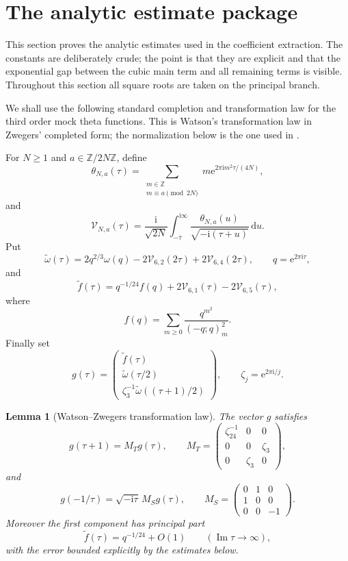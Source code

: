 \documentclass[10pt,a4paper]{amsart}
\newtheorem{lemma}[theorem]{Lemma}
\newcommand{\ii}{\mathrm i}
\newcommand{\e}{\mathrm e}
\newcommand{\dd}{\mathrm d}
\newcommand{\Z}{\mathbb Z}
\newcommand{\Impart}{\operatorname{Im}}
\begin{document}
\section{The analytic estimate package}\label{sec:estimate-package}

This section proves the analytic estimates used in the coefficient extraction.  The
constants are deliberately crude; the point is that they are explicit and that the
exponential gap between the cubic main term and all remaining terms is visible.
Throughout this section all square roots are taken on the principal branch.

We shall use the following standard completion and transformation law for the third
order mock theta functions.  This is Watson's transformation law in Zwegers'
completed form; the normalization below is the one used in \cite{ZwegersThesis,GarvanMukhopadhyay}.

For $N\geq1$ and $a\in\Z/2N\Z$, define
\[
\theta_{N,a}(\tau)=\sum_{\substack{m\in\Z\\ m\equiv a\pmod{2N}}}
 m\e^{2\pi\ii m^2\tau/(4N)},
\]
and
\[
\mathcal V_{N,a}(\tau)
=
\frac{\ii}{\sqrt{2N}}
\int_{-\overline\tau}^{\ii\infty}
\frac{\theta_{N,a}(u)}{\sqrt{-\ii(\tau+u)}}\,\dd u.
\]
Put
\[
\widetilde\omega(\tau)
=
2q^{2/3}\omega(q)-2\mathcal V_{6,2}(2\tau)+2\mathcal V_{6,4}(2\tau),
\qquad q=\e^{2\pi\ii\tau},
\]
and
\[
\widetilde f(\tau)
=
q^{-1/24}f(q)+2\mathcal V_{6,1}(\tau)-2\mathcal V_{6,5}(\tau),
\]
where
\[
f(q)=\sum_{m\geq0}\frac{q^{m^2}}{(-q;q)_m^2}.
\]
Finally set
\[
g(\tau)=
\begin{pmatrix}
\widetilde f(\tau)\\
\widetilde\omega(\tau/2)\\
\zeta_3^{-1}\widetilde\omega((\tau+1)/2)
\end{pmatrix},
\qquad
\zeta_j=\e^{2\pi\ii/j}.
\]

\begin{lemma}[Watson--Zwegers transformation law]\label{lem:wz-transform}
The vector $g$ satisfies
\begin{equation}\label{eq:gT}
g(\tau+1)=M_Tg(\tau),
\qquad
M_T=
\begin{pmatrix}
\zeta_{24}^{-1}&0&0\\
0&0&\zeta_3\\
0&\zeta_3&0
\end{pmatrix},
\end{equation}
and
\begin{equation}\label{eq:gS}
g(-1/\tau)=\sqrt{-\ii\tau}\,M_Sg(\tau),
\qquad
M_S=
\begin{pmatrix}
0&1&0\\
1&0&0\\
0&0&-1
\end{pmatrix}.
\end{equation}
Moreover the first component has principal part
\begin{equation}\label{eq:f-principal-part}
\widetilde f(\tau)=q^{-1/24}+O(1)
\qquad (\Impart \tau\to\infty),
\end{equation}
with the error bounded explicitly by the estimates below.
\end{lemma}
\end{document}
